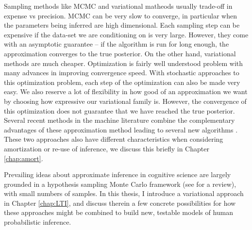 Sampling methods like MCMC and variational matheods usually trade-off in expense vs precision. MCMC can be very slow to converge, in particular when the parameters being inferred are high dimensional. Each sampling step can be expensive if the data-set we are conditioning on is very large. However, they come with an asymptotic guarantee -- if the algorithm is run for long enough, the approximation converges to the true posterior. On the other hand, variational methods are much cheaper. Optimization is fairly well understood problem with many advances in improving convergence speed. With stochastic approaches to this optimization problem, each step of the optimization can also be made very easy. We also reserve a lot of flexibility in how good of an approximation we want by choosing how expressive our variational family is.  However, the convergence of this optimization does not guarantee that we have reached the true posterior. Several recent methods in the machine literature combine the complementary advantages of these approximation method leading to several new algorithms \citep{li2017approximate, naesseth2017variational, ruiz2019contrast}. These two approaches also have different characteristics when considering amortization or re-use of inference, we discuss this briefly in Chapter \ref{chap:amort}. 

Prevailing ideas about approximate inference in cognitive science are largely grounded in a hypothesis sampling Monte Carlo framework (see \citet{sanborn2016bayesian} for a review), with small numbers of samples. In this thesis, I introduce a variational approach in Chapter \ref{chap:LTI}, and discuss therein a few concrete possibilities for how these approaches might be combined to build new, testable models of human probabilistic inference.


%

